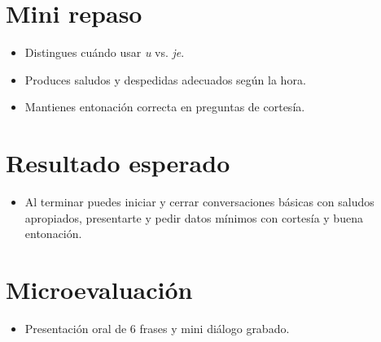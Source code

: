 \section{Mini repaso}
\begin{itemize}[leftmargin=*]
	\item Distingues cuándo usar \textit{u} vs. \textit{je}.
	\item Produces saludos y despedidas adecuados según la hora.
	\item Mantienes entonación correcta en preguntas de cortesía.
\end{itemize}

\section{Resultado esperado}
\begin{itemize}[leftmargin=*]
	\item Al terminar puedes iniciar y cerrar conversaciones básicas con saludos apropiados, presentarte y pedir datos mínimos con cortesía y buena entonación.\end{itemize}

\section{Microevaluación}
\begin{itemize}[leftmargin=*]
	\item Presentación oral de 6 frases y mini diálogo grabado.
\end{itemize}
